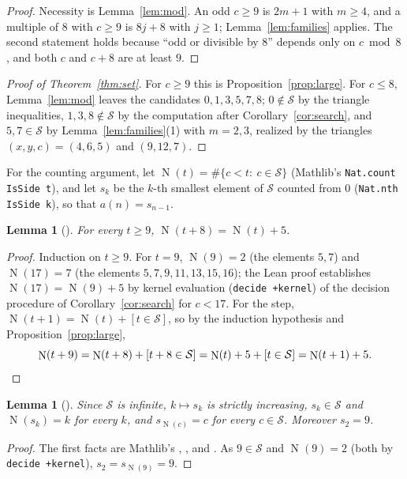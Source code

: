 \documentclass[11pt]{amsart}
\theoremstyle{plain}
\newtheorem{lemma}[theorem]{Lemma}
\theoremstyle{definition}
\newcommand{\code}[1]{\texttt{#1}}
\newcommand{\Side}{\mathcal{S}}
\DeclareMathOperator{\cnt}{N}
\begin{document}
\begin{proof}
Necessity is Lemma~\ref{lem:mod}. An odd $c\ge9$ is $2m+1$ with $m\ge4$, and a multiple of $8$ with $c\ge9$ is $8j+8$ with $j\ge1$; Lemma~\ref{lem:families} applies. The second statement holds because ``odd or divisible by $8$'' depends only on $c\bmod8$, and both $c$ and $c+8$ are at least $9$.
\end{proof}

\begin{proof}[Proof of Theorem~\ref{thm:set}]
For $c\ge9$ this is Proposition~\ref{prop:large}. For $c\le8$, Lemma~\ref{lem:mod} leaves the candidates $0,1,3,5,7,8$; $0\notin\Side$ by the triangle inequalities, $1,3,8\notin\Side$ by the computation after Corollary~\ref{cor:search}, and $5,7\in\Side$ by Lemma~\ref{lem:families}(1) with $m=2,3$, realized by the triangles $(x,y,c)=(4,6,5)$ and $(9,12,7)$.
\end{proof}

For the counting argument, let $\cnt(t)=\#\{c<t:\ c\in\Side\}$ (Mathlib's \code{Nat.count IsSide t}), and let $s_k$ be the $k$-th smallest element of $\Side$ counted from $0$ (\code{Nat.nth IsSide k}), so that $a(n)=s_{n-1}$.

\begin{lemma}[]\label{lem:count}
For every $t\ge9$, $\cnt(t+8)=\cnt(t)+5$.
\end{lemma}

\begin{proof}
Induction on $t\ge9$. For $t=9$, $\cnt(9)=2$ (the elements $5,7$) and $\cnt(17)=7$ (the elements $5,7,9,11,13,15,16$); the Lean proof establishes $\cnt(17)=\cnt(9)+5$ by kernel evaluation (\texttt{decide +kernel}) of the decision procedure of Corollary~\ref{cor:search} for $c<17$. For the step, $\cnt(t+1)=\cnt(t)+[t\in\Side]$, so by the induction hypothesis and Proposition~\ref{prop:large},
\[
  \cnt(t+9)=\cnt(t+8)+[t+8\in\Side]=\cnt(t)+5+[t\in\Side]=\cnt(t+1)+5.\qedhere
\]
\end{proof}

\begin{lemma}[]\label{lem:nth}
Since $\Side$ is infinite, $k\mapsto s_k$ is strictly increasing, $s_k\in\Side$ and $\cnt(s_k)=k$ for every $k$, and $s_{\cnt(c)}=c$ for every $c\in\Side$. Moreover $s_2=9$.
\end{lemma}

\begin{proof}
The first facts are Mathlib's , ,  and . As $9\in\Side$ and $\cnt(9)=2$ (both by \texttt{decide +kernel}), $s_2=s_{\cnt(9)}=9$.
\end{proof}
\end{document}
